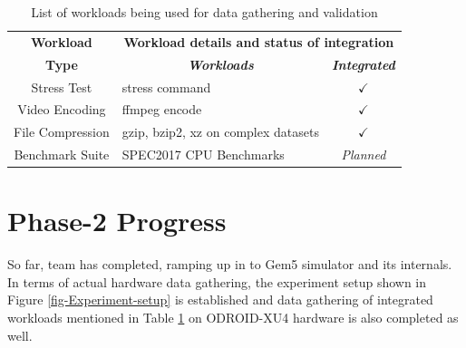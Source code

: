 \documentclass[conference]{IEEEtran}
\begin{document}
        \begin{table}[htbp]
            \caption{List of workloads being used for data gathering and validation}
            \begin{center}
                \begin{tabular}{|c|p{4cm}|p{1cm}|}
                    \hline
                    \textbf{Workload}&\multicolumn{2}{|c|}{\textbf{Workload details and status  of integration}} \\
                    \cline{2-3} 
                    \textbf{Type} & \multicolumn{1}{|c|}{\textbf{\textit{Workloads}}} & \multicolumn{1}{|c|}{\textbf{\textit{Integrated}}}  \\
                    \hline
                    Stress Test & stress command \cite{linux-stress-testing} & \multicolumn{1}{|c|}{$\checkmark$} \\
                    \hline
                    Video Encoding & ffmpeg encode \cite{linux-stress-testing} & \multicolumn{1}{|c|}{$\checkmark$} \\
                    \hline
                    File Compression & gzip, bzip2, xz on complex datasets \cite{compression-benchmarking} & \multicolumn{1}{|c|}{$\checkmark$} \\
                    \hline
                    Benchmark Suite & SPEC2017 CPU Benchmarks \cite{10.1145/3185768.3185771} & \multicolumn{1}{|c|}{\textit{Planned}} \\
                    \hline
                \end{tabular}
                \label{Workload-listing}
            \end{center}
        \end{table}

\section{Phase-2 Progress}
    \par So far, team has completed, ramping up in to Gem5 simulator and its internals. In terms of actual hardware data gathering, the experiment setup shown in Figure \ref{fig-Experiment-setup} is established and data gathering of integrated workloads mentioned in Table \ref{Workload-listing} on ODROID-XU4 hardware is also completed as well.
\end{document}
